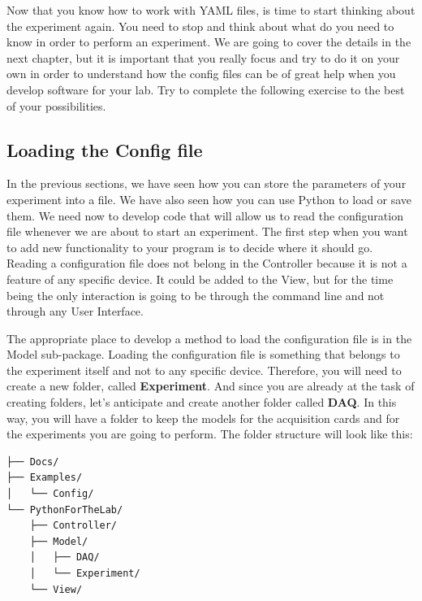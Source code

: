 Now that you know how to work with YAML files, is time to start thinking about the experiment again. You need to stop and think about what do you need to know in order to perform an experiment. We are going to cover the details in the next chapter, but it is important that you really focus and try to do it on your own in order to understand how the config files can be of great help when you develop software for your lab. Try to complete the following exercise to the best of your possibilities.


\subsection{Loading the Config file}\label{subsection:loading-the-config}
In the previous sections, we have seen how you can store the parameters of your experiment into a file. We have also seen how you can use Python to load or save them. We need now to develop code that will allow us to read the configuration file whenever we are about to start an experiment. The first step when you want to add new functionality to your program is to decide where it should go. Reading a configuration file does not belong in the Controller because it is not a feature of any specific device. It could be added to the View, but for the time being the only interaction is going to be through the command line and not through any User Interface. 

The appropriate place to develop a method to load the configuration file is in the Model sub-package. Loading the configuration file is something that belongs to the experiment itself and not to any specific device. Therefore, you will need to create a new folder, called \textbf{Experiment}. And since you are already at the task of creating folders, let's anticipate and create another folder called \textbf{DAQ}. In this way, you will have a folder to keep the models for the acquisition cards and for the experiments you are going to perform. The folder structure will look like this:

\begin{verbatim}
├── Docs/
├── Examples/
│   └── Config/
└── PythonForTheLab/
    ├── Controller/
    ├── Model/
    │   ├── DAQ/
    │   └── Experiment/    
    └── View/
\end{verbatim}

